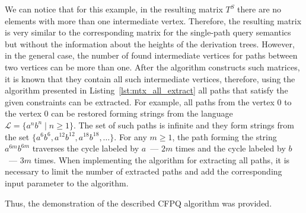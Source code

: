 We can notice that for this example, in the resulting matrix $T^S$ there are no elements with more than one intermediate vertex. Therefore, the resulting matrix is very similar to the corresponding matrix for the single-path query semantics but without the information about the heights of the derivation trees. However, in the general case, the number of found intermediate vertices for paths between two vertices can be more than one. After the algorithm constructs such matrices, it is known that they contain all such intermediate vertices, therefore, using the algorithm presented in Listing~\ref{lst:mtx_all_extract} all paths that satisfy the given constraints can be extracted. For example, all paths from the vertex 0 to the vertex 0 can be restored forming strings from the language $\mathcal{L} = \{a^nb^n \mid n \geq 1\}$. The set of such paths is infinite and they form strings from the set $\{a^6 b^6, a^{12} b^{12}, a^{18} b^{18}, \ldots \}$. For any $m \geq 1$, the path forming the string $a^{6m} b^{6m}$ traverses the cycle labeled by $a$~--- $2m$ times and the cycle labeled by $b$~--- $3m$ times. When implementing the algorithm for extracting all paths, it is necessary to limit the number of extracted paths and add the corresponding input parameter to the algorithm.

Thus, the demonstration of the described CFPQ algorithm was provided.

